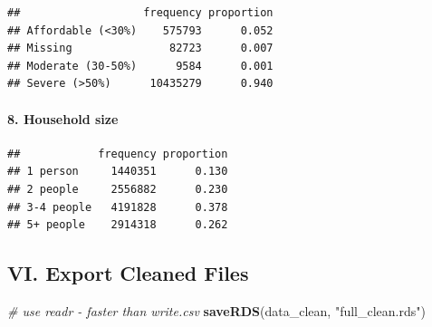 \documentclass[
]{article}
\newenvironment{Shaded}{\begin{snugshade}}{\end{snugshade}}
\newcommand{\AttributeTok}[1]{\textcolor[rgb]{0.13,0.29,0.53}{#1}}
\newcommand{\CommentTok}[1]{\textcolor[rgb]{0.56,0.35,0.01}{\textit{#1}}}
\newcommand{\ConstantTok}[1]{\textcolor[rgb]{0.56,0.35,0.01}{#1}}
\newcommand{\DecValTok}[1]{\textcolor[rgb]{0.00,0.00,0.81}{#1}}
\newcommand{\FunctionTok}[1]{\textcolor[rgb]{0.13,0.29,0.53}{\textbf{#1}}}
\newcommand{\NormalTok}[1]{#1}
\newcommand{\OtherTok}[1]{\textcolor[rgb]{0.56,0.35,0.01}{#1}}
\newcommand{\SpecialCharTok}[1]{\textcolor[rgb]{0.81,0.36,0.00}{\textbf{#1}}}
\newcommand{\StringTok}[1]{\textcolor[rgb]{0.31,0.60,0.02}{#1}}
\begin{document}
\begin{verbatim}
##                   frequency proportion
## Affordable (<30%)    575793      0.052
## Missing               82723      0.007
## Moderate (30-50%)      9584      0.001
## Severe (>50%)      10435279      0.940
\end{verbatim}

\paragraph{8. Household size}\label{household-size}

\begin{Shaded}
\end{Shaded}

\begin{verbatim}
##            frequency proportion
## 1 person     1440351      0.130
## 2 people     2556882      0.230
## 3-4 people   4191828      0.378
## 5+ people    2914318      0.262
\end{verbatim}

\subsection{VI. Export Cleaned Files}\label{vi.-export-cleaned-files}

\begin{Shaded}
\begin{Highlighting}[]
\CommentTok{\# use readr {-} faster than write.csv}
\FunctionTok{saveRDS}\NormalTok{(data\_clean, }\StringTok{"full\_clean.rds"}\NormalTok{)}
\end{Highlighting}
\end{Shaded}
\end{document}
